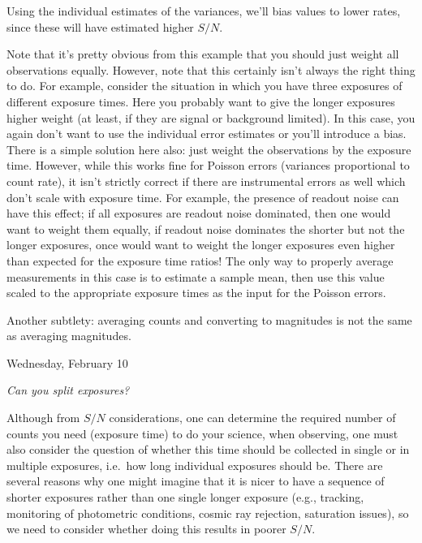 \documentclass[12pt]{article}
\begin{document}
Using the individual estimates of the variances, we'll bias values to
lower rates, since these will have estimated higher $S/N$.

Note that it's pretty obvious from this example that you should just
weight all observations equally. However, note that this certainly
isn't always the right thing to do. For example, consider the
situation in which you have three exposures of different exposure
times. Here you probably want to give the longer exposures higher
weight (at least, if they are signal or background limited). In this
case, you again don't want to use the individual error estimates or
you'll introduce a bias. There is a simple solution here also: just
weight the observations by the exposure time. However, while this
works fine for Poisson errors (variances proportional to count rate),
it isn't strictly correct if there are instrumental errors as well
which don't scale with exposure time. For example, the presence of
readout noise can have this effect; if all exposures are readout
noise dominated, then one would want to weight them equally, if
readout noise dominates the shorter but not the longer exposures,
once would want to weight the longer exposures even higher than
expected for the exposure time ratios! The only way to properly
average measurements in this case is to estimate a sample mean, then
use this value scaled to the appropriate exposure times as the input
for the Poisson errors.

Another subtlety: averaging counts and converting to magnitudes is
not the same as averaging magnitudes.

\textcolor{om}{\emph{}}

\textcolor{date}{Wednesday, February 10}

\emph{Can you split exposures?}

Although from $S/N$ considerations, one can determine the required
number of counts you need (exposure time) to do your science, when
observing, one must also consider the question of whether this time
should be collected in single or in multiple exposures, i.e.\ how long
individual exposures should be. There are several reasons why one
might imagine that it is nicer to have a sequence of shorter
exposures rather than one single longer exposure (e.g., tracking,
monitoring of photometric conditions, cosmic ray rejection,
saturation issues), so we need to consider whether doing this results
in poorer $S/N$.
\end{document}
